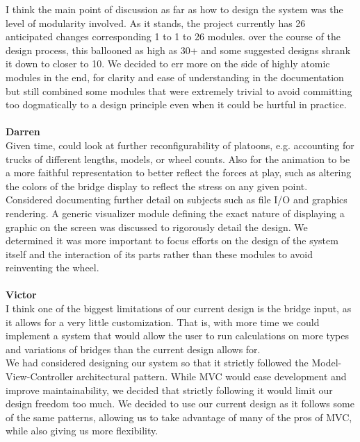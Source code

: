 \documentclass[12pt, titlepage]{article}
\begin{document}
I think the main point of discussion as far as how to design the system was the level of modularity involved. As it stands, the project currently has 26 anticipated changes
corresponding 1 to 1 to 26 modules. over the course of the design process, this ballooned as high as 30+ and some suggested designs shrank it down to closer to 10. We decided
to err more on the side of highly atomic modules in the end, for clarity and ease of understanding in the documentation but still combined some modules that were extremely
trivial to avoid committing too dogmatically to a design principle even when it could be hurtful in practice.\\\\

\noindent\textbf{Darren}\\
Given time, could look at further reconfigurability of platoons, e.g. accounting for trucks of different lengths, models, or wheel counts. Also for the animation to be a more 
faithful representation to better reflect the forces at play, such as altering the colors of the bridge display to reflect the stress on any given point.\\

Considered documenting further detail on subjects such as file I/O and graphics rendering. A generic visualizer module defining the exact nature of displaying 
a graphic on the screen was discussed to rigorously detail the design. We determined it was more important to focus efforts on the design of the system itself and the 
interaction of its parts rather than these modules to avoid reinventing the wheel.\\\\

\noindent\textbf{Victor}\\
I think one of the biggest limitations of our current design is the bridge input, as it allows for a very little customization. That is, with more time we could implement a 
system that would allow the user to run calculations on more types and variations of bridges than the current design allows for.\\

We had considered designing our system so that it strictly followed the Model-View-Controller architectural pattern. While MVC would ease development and improve
maintainability, we decided that strictly following it would limit our design freedom too much. We decided to use our current design as it follows some of the same patterns,
allowing us to take advantage of many of the pros of MVC, while also giving us more flexibility.\\\\
\end{document}
